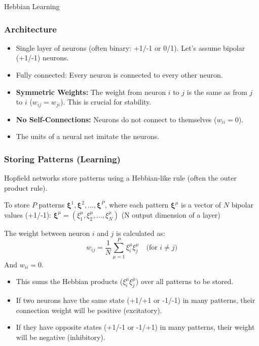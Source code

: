 \documentclass[aspectratio=169]{beamer}
\begin{document}
\begin{frame}{Hebbian Learning}
	\frametitle{Architecture}
	\begin{itemize}
		\item Single layer of neurons (often binary: +1/-1 or 0/1). Let's assume
		      bipolar (+1/-1) neurons.
		\item Fully connected: Every neuron is connected to every other neuron.
		\item \textbf{Symmetric Weights:} The weight from neuron $i$ to $j$ is the same as from $j$ to $i$ ($w_{ij} = w_{ji}$). This is crucial for stability.
		\item \textbf{No Self-Connections:} Neurons do not connect to themselves ($w_{ii} = 0$).
		\item The units of a neural net imitate the neurons.
	\end{itemize}
\end{frame}

\begin{frame}
	\frametitle{Storing Patterns (Learning)}
	Hopfield networks store patterns using a Hebbian-like rule (often the outer product rule).

	To store $P$ patterns $\mathbf{\xi}^1, \mathbf{\xi}^2, ..., \mathbf{\xi}^P$,
	where each pattern $\mathbf{\xi}^\mu$ is a vector of $N$ bipolar values
	(+1/-1): $\mathbf{\xi}^\mu = (\xi_1^\mu, \xi_2^\mu, ..., \xi_N^\mu)$ (N output
	dimension of a layer)

	The weight between neuron $i$ and $j$ is calculated as:
	\begin{equation*}
		w_{ij} = \frac{1}{N} \sum_{\mu=1}^{P} \xi_i^\mu \xi_j^\mu \quad \text{(for } i \neq j \text{)}
	\end{equation*}
	And $w_{ii} = 0$.

	\vspace{0.5em}
	\begin{itemize}
		\item This sums the Hebbian products ($\xi_i^\mu \xi_j^\mu$) over all
		      patterns to be stored.
		\item If two neurons have the same state (+1/+1 or -1/-1) in many patterns,
		      their connection weight will be positive (excitatory).
		\item If they have opposite states (+1/-1 or -1/+1) in many patterns, their
		      weight will be negative (inhibitory).
	\end{itemize}
\end{frame}
\end{document}
